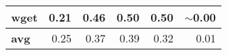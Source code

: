 \begin{table}[!tb]
{\begin{tabular}{|l|r|r|r|r|r|}
            wget                                & 0.21                                   & 0.46                                 & 0.50                                   & 0.50                                             & $\sim$0.00                                  \\ \hline
            \textbf{avg}                                 & 0.25                                   & 0.37                                 & 0.39                                   & 0.32                                             & 0.01                                  \\ \hline
            \end{tabular}
        }
\end{table}